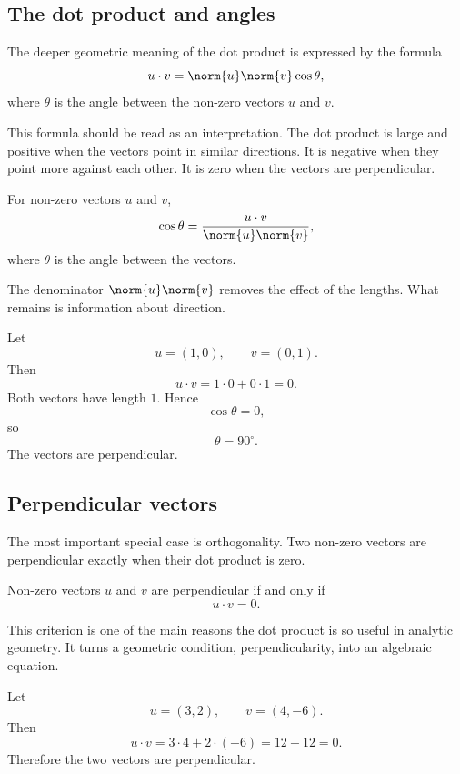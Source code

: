 \subsection*{The dot product and angles}

The deeper geometric meaning of the dot product is expressed by the formula
\[
u\cdot v=\norm{u}\norm{v}\cos\theta,
\]
where \(\theta\) is the angle between the non-zero vectors \(u\) and \(v\).

This formula should be read as an interpretation. The dot product is large and positive when the vectors point in similar directions. It is negative when they point more against each other. It is zero when the vectors are perpendicular.

\begin{theorembox}
For non-zero vectors \(u\) and \(v\),
\[
\cos\theta=\frac{u\cdot v}{\norm{u}\norm{v}},
\]
where \(\theta\) is the angle between the vectors.
\end{theorembox}

The denominator \(\norm{u}\norm{v}\) removes the effect of the lengths. What remains is information about direction.

\begin{examplebox}
Let
\[
u=(1,0),
\qquad
v=(0,1).
\]
Then
\[
u\cdot v=1\cdot0+0\cdot1=0.
\]
Both vectors have length \(1\). Hence
\[
\cos\theta=0,
\]
so
\[
\theta=90^\circ.
\]
The vectors are perpendicular.
\end{examplebox}

\subsection*{Perpendicular vectors}

The most important special case is orthogonality. Two non-zero vectors are perpendicular exactly when their dot product is zero.

\begin{theorembox}
Non-zero vectors \(u\) and \(v\) are perpendicular if and only if
\[
u\cdot v=0.
\]
\end{theorembox}

This criterion is one of the main reasons the dot product is so useful in analytic geometry. It turns a geometric condition, perpendicularity, into an algebraic equation.

\begin{examplebox}
Let
\[
u=(3,2),
\qquad
v=(4,-6).
\]
Then
\[
u\cdot v=3\cdot4+2\cdot(-6)=12-12=0.
\]
Therefore the two vectors are perpendicular.
\end{examplebox}

